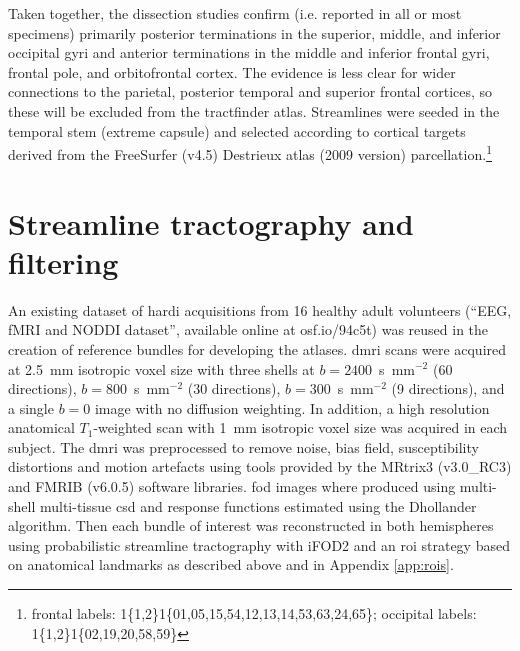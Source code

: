 Taken together, the dissection studies confirm (i.e. reported in all or most specimens) primarily posterior terminations in the superior, middle, and inferior occipital gyri and anterior terminations in the middle and inferior frontal gyri, frontal pole, and orbitofrontal cortex.
The evidence is less clear for wider connections to the parietal, posterior temporal and superior frontal cortices, so these will be excluded from the tractfinder atlas.
Streamlines were seeded in the temporal stem (extreme capsule) and selected according to cortical targets derived from the FreeSurfer (v4.5) Destrieux atlas\autocite{Destrieux2010} (2009 version) parcellation.\footnote[2]{frontal labels: 1\{1,2\}1\{01,05,15,54,12,13,14,53,63,24,65\}; occipital labels: 1\{1,2\}1\{02,19,20,58,59\}}

\section{Streamline tractography and filtering}\label{sec:atlasmethods}

An existing dataset of \gls{hardi} acquisitions from 16 healthy adult volunteers (``EEG, fMRI and NODDI dataset''\autocite{Clayden2020}, available online at osf.io/94c5t) was reused in the creation of reference bundles for developing the atlases.
\Gls{dmri} scans were acquired at 2.5~mm isotropic voxel size with three shells at $b=2400$~s~mm$^{-2}$ (60 directions), $b=800$~s~mm$^{-2}$ (30 directions), $b=300$~s~mm$^{-2}$ (9 directions), and a single $b=0$ image with no diffusion weighting.
In addition, a high resolution anatomical $T_1$-weighted scan with 1~mm isotropic voxel size was acquired in each subject.
The \gls{dmri} was preprocessed to remove noise, bias field, susceptibility distortions and motion artefacts using tools provided by the MRtrix3 (v3.0\_RC3) and FMRIB (v6.0.5) software libraries.
\Gls{fod} images where produced using multi-shell multi-tissue \gls{csd}\autocite{Jeurissen2014,Tournier2019} and response functions estimated using the Dhollander algorithm\autocite{Dhollander2016}.
Then each bundle of interest was reconstructed in both hemispheres using probabilistic streamline tractography with iFOD2 \autocite{Tournier2010} and an \gls{roi} strategy based on anatomical landmarks as described above and in Appendix \ref{app:rois}.

